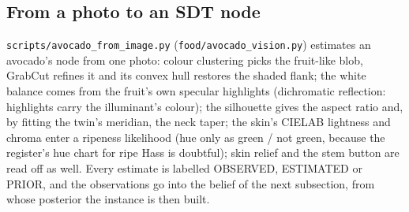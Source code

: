 \documentclass[10.5pt,a4paper]{article}
\begin{document}
\subsection{From a photo to an SDT node}
\texttt{scripts/avocado\_from\_image.py} (\texttt{food/avocado\_vision.py}) estimates an avocado's node from one
photo: colour clustering picks the fruit-like blob, GrabCut refines it and its convex hull restores the shaded flank;
the white balance comes from the fruit's own specular highlights (dichromatic reflection: highlights carry the
illuminant's colour); the silhouette gives the aspect ratio and, by fitting the twin's meridian, the neck taper; the
skin's CIELAB lightness and chroma enter a ripeness likelihood (hue only as green / not green, because the register's
hue chart for ripe Hass is doubtful); skin relief and the stem button are read off as well. Every estimate is
labelled OBSERVED, ESTIMATED or PRIOR, and the observations go into the belief of the next subsection, from whose
posterior the instance is then built.
\end{document}
